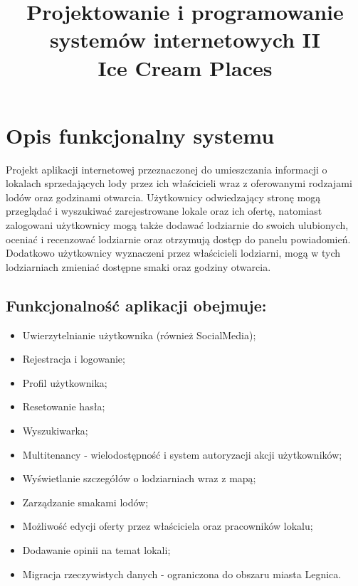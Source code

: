 \documentclass{article}
\title{
	Projektowanie i programowanie systemów internetowych II\\
	\Huge{Ice Cream Places}
}
\date{}
\begin{document}
	\maketitle

	\section {Opis funkcjonalny systemu}
    Projekt aplikacji internetowej przeznaczonej do umieszczania informacji o lokalach sprzedających lody przez ich właścicieli wraz z oferowanymi rodzajami lodów oraz godzinami otwarcia. Użytkownicy odwiedzający stronę mogą przeglądać i wyszukiwać zarejestrowane lokale oraz ich ofertę, natomiast zalogowani użytkownicy mogą także dodawać lodziarnie do swoich ulubionych, oceniać i recenzować lodziarnie oraz otrzymują dostęp do panelu powiadomień. Dodatkowo użytkownicy wyznaczeni przez właścicieli lodziarni, mogą w tych lodziarniach zmieniać dostępne smaki oraz godziny otwarcia. 
    
    \subsection{Funkcjonalność aplikacji obejmuje:}
    \begin{itemize}
        \item Uwierzytelnianie użytkownika (również SocialMedia);
        \item Rejestracja i logowanie;
        \item Profil użytkownika;
        \item Resetowanie hasła;
        \item Wyszukiwarka;
        \item Multitenancy - wielodostępność i system autoryzacji akcji użytkowników;
        \item Wyświetlanie szczegółów o lodziarniach wraz z mapą;
        \item Zarządzanie smakami lodów;
        \item Możliwość edycji oferty przez właściciela oraz pracowników lokalu;
        \item Dodawanie opinii na temat lokali;
        \item Migracja rzeczywistych danych - ograniczona do obszaru miasta Legnica.
    \end{itemize}
\end{document}
